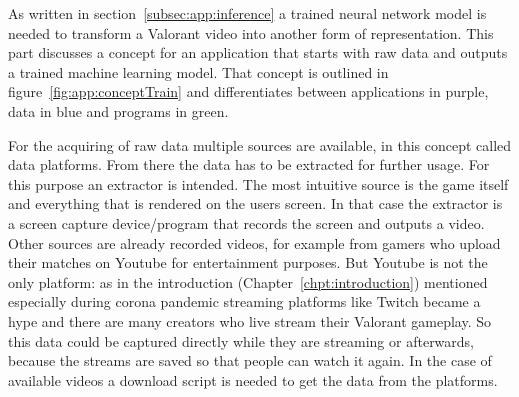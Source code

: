 As written in section~\ref{subsec:app:inference} a trained neural network model is needed to 
transform a Valorant video into another form of representation. This part discusses a concept for an 
application that starts with raw data and outputs a trained machine learning model. That concept is 
outlined in figure~\ref{fig:app:conceptTrain} and differentiates between applications in purple, data 
in blue and programs in green.

For the acquiring of raw data multiple sources are available, in this concept called data platforms. 
From there the data has to be extracted for further usage. For this purpose an extractor is intended.
The most intuitive source is the game itself and everything that is rendered on the users screen. In 
that case the extractor is a screen capture device/program that records the screen and outputs a 
video. Other sources are already recorded videos, for example from gamers who upload their 
matches on Youtube for entertainment purposes. But Youtube is not the only platform: as in the 
introduction (Chapter~\ref{chpt:introduction}) mentioned especially during corona pandemic 
streaming platforms like Twitch became a hype and there are many creators who live stream their 
Valorant gameplay. So this data could be captured directly while they are streaming or afterwards, 
because the streams are saved so that people can watch it again. In the case of available videos a 
download script is needed to get the data from the platforms.

